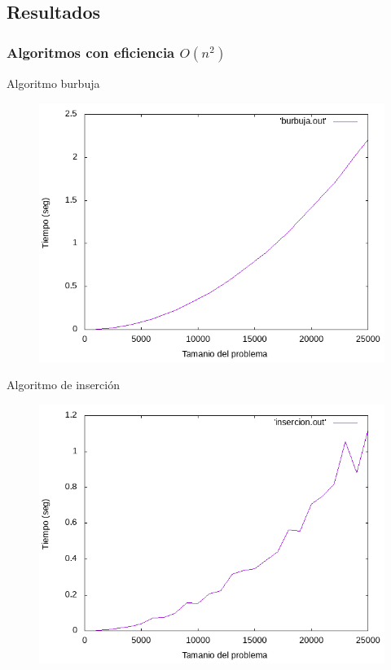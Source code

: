 \documentclass{beamer}
\begin{document}
\subsection{Resultados}

\subsubsection{Algoritmos con eficiencia $O(n^2)$}

\begin{frame}[fragile]{Algoritmo burbuja}
\begin{figure}[H]
\centering
\includegraphics[scale=0.5]{empirica_burbuja.png}
\end{figure}
\end{frame}

\begin{frame}[fragile]{Algoritmo de inserción}
\begin{figure}[H]
\centering
\includegraphics[scale=0.5]{empirica_insercion.png}
\end{figure}
\end{frame}
\end{document}
